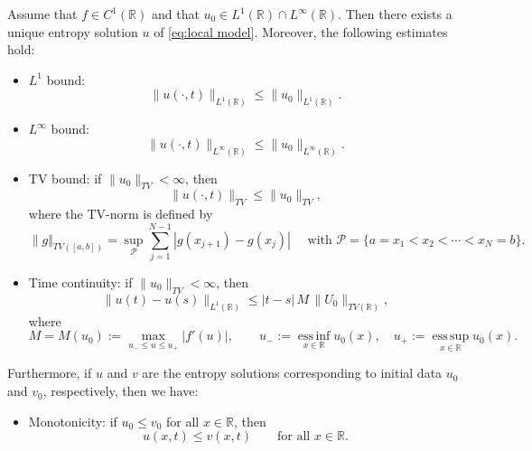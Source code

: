 \begin{theorem}
    Assume that $f \in C^1(\mathbb{R})$ and that $u_0 \in L^1(\mathbb{R}) \cap L^\infty(\mathbb{R})$. Then there exists a unique entropy solution $u$ of \eqref{eq:local model}. Moreover, the following estimates hold:

    \begin{itemize}
        \item $L^1$ bound:
              \begin{equation}\label{eq:continuous_L^1_bound}
                  \|u(\cdot,t)\|_{L^1(\mathbb{R})} \le \|u_0\|_{L^1(\mathbb{R})}.
              \end{equation}

        \item $L^\infty$ bound:
              \begin{equation}\label{eq:continuous_supremum_bound}
                  \|u(\cdot,t)\|_{L^\infty(\mathbb{R})}
                  \le
                  \|u_0\|_{L^\infty(\mathbb{R})}.
              \end{equation}

        \item TV bound: if $\|u_0\|_{TV} < \infty$, then
              \begin{equation}\label{eq:continuous_TV}
                  \|u(\cdot,t)\|_{TV} \le \|u_0\|_{TV},
              \end{equation}
              where the TV-norm is defined by
              \[
                  \| g\Vert_{TV([a,b])} = \sup\limits_{\mathcal{P}} \sum_{j=1}^{N-1}|g(x_{j+1})- g(x_j)| \quad \text{ with } \mathcal{P}= \{a= x_1 < x_2 < \cdots < x_N=b \}.
              \]

        \item Time continuity: if $\|u_0\|_{TV} < \infty$, then
              \begin{equation}\label{eq:continuous_time_continuity}
                  \|u(t)-u(s)\|_{L^1(\mathbb{R})}
                  \le
                  |t-s|\, M\, \|U_0\|_{TV(\mathbb{R})},
              \end{equation}
              where
              \[
                  M = M(u_0) := \max_{u_- \le u \le u_+} |f'(u)|,
                  \qquad
                  u_- := \operatorname*{ess\,inf}_{x\in\mathbb{R}} u_0(x),
                  \quad
                  u_+ := \operatorname*{ess\,sup}_{x\in\mathbb{R}} u_0(x).
              \]
    \end{itemize}

    Furthermore, if $u$ and $v$ are the entropy solutions corresponding to initial data
    $u_0$ and $v_0$, respectively, then we have:
    \begin{itemize}
        \item Monotonicity: if $u_0 \leq v_0$ for all $ x \in \mathbb{R}$, then \begin{equation}\label{eq:continuous_monotonicity}
                  u(x,t) \leq v(x,t) \qquad \text{for all } x \in \mathbb{R}.
              \end{equation}
    \end{itemize}
\end{theorem}

